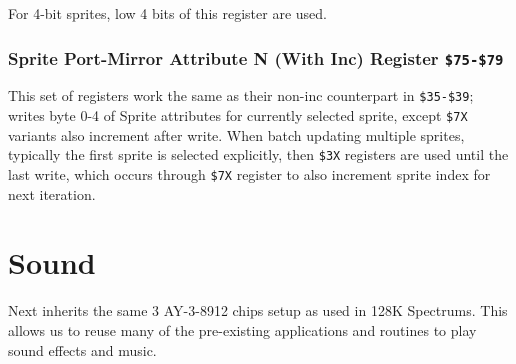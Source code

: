 \documentclass[12pt,twoside,openright,a4paper]{book}
\begin{document}
For 4-bit sprites, low 4 bits of this register are used.


\subsubsection{Sprite Port-Mirror Attribute N (With Inc) Register {\tt \$75-\$79}}

This set of registers work the same as their non-inc counterpart in {\tt \$35-\$39}; writes byte 0-4 of Sprite attributes for currently selected sprite, except {\tt \$7X} variants also increment  after write. When batch updating multiple sprites, typically the first sprite is selected explicitly, then {\tt \$3X} registers are used until the last write, which occurs through {\tt \$7X} register to also increment sprite index for next iteration.




\pagebreak
\section{Sound}
\label{zx_next_sound}


Next inherits the same 3 AY-3-8912 chips setup as used in 128K Spectrums. This allows us to reuse many of the pre-existing applications and routines to play sound effects and music.
\end{document}

